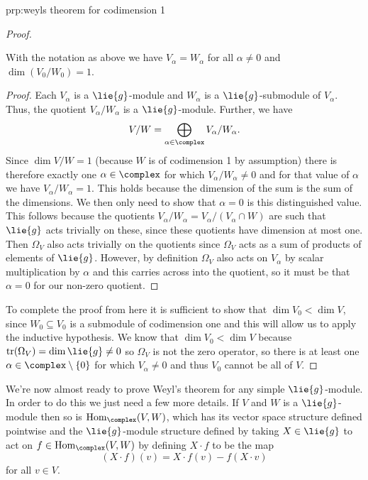 \documentclass[fleqn]{NotesClass}
\DeclareMathOperator{\Hom}{Hom}
\DeclareMathOperator{\tr}{tr}
\begin{document}
\begin{prp}{}{prp:weyls theorem for codimension 1}
\begin{proof}
            \begin{clm}{}{}
                With the notation as above we have \(V_\alpha = W_\alpha\) for all \(\alpha \ne 0\) and \(\dim (V_0/W_0) = 1\).
                \begin{proof}
                    Each \(V_\alpha\) is a \(\lie{g}\)-module and \(W_\alpha\) is a \(\lie{g}\)-submodule of \(V_\alpha\).
                    Thus, the quotient \(V_\alpha/W_\alpha\) is a \(\lie{g}\)-module.
                    Further, we have
                    \begin{equation}
                        V/W = \bigoplus_{\alpha \in \complex} V_\alpha/W_\alpha.
                    \end{equation}
                    Since \(\dim V/W = 1\) (because \(W\) is of codimension 1 by assumption) there is therefore exactly one \(\alpha \in \complex\) for which \(V_\alpha/W_\alpha \ne 0\) and for that value of \(\alpha\) we have \(V_\alpha/W_\alpha = 1\).
                    This holds because the dimension of the sum is the sum of the dimensions.
                    We then only need to show that \(\alpha = 0\) is this distinguished value.
                    This follows because the quotients \(V_\alpha/W_\alpha = V_\alpha/(V_\alpha \cap W)\) are such that \(\lie{g}\) acts trivially on these, since these quotients have dimension at most one.
                    Then \(\Omega_V\) also acts trivially on the quotients since \(\Omega_V\) acts as a sum of products of elements of \(\lie{g}\).
                    However, by definition \(\Omega_V\) also acts on \(V_\alpha\) by scalar multiplication by \(\alpha\) and this carries across into the quotient, so it must be that \(\alpha = 0\) for our non-zero quotient.
                \end{proof}
            \end{clm}
            
            To complete the proof from here it is sufficient to show that \(\dim V_0 < \dim V\), since \(W_0 \subseteq V_0\) is a submodule of codimension one and this will allow us to apply the inductive hypothesis.
            We know that \(\dim V_0 < \dim V\) because \(\tr(\Omega_V) = \dim \lie{g} \ne 0\) so \(\Omega_V\) is not the zero operator, so there is at least one \(\alpha \in \complex\setminus\{0\}\) for which \(V_\alpha \ne 0\) and thus \(V_0\) cannot be all of \(V\).
        \end{proof}
    \end{prp}
    
    We're now almost ready to prove Weyl's theorem for any simple \(\lie{g}\)-module.
    In order to do this we just need a few more details.
    If \(V\) and \(W\) is a \(\lie{g}\)-module then so is \(\Hom_{\complex}(V, W)\), which has its vector space structure defined pointwise and the \(\lie{g}\)-module structure defined by taking \(X \in \lie{g}\) to act on \(f \in \Hom_{\complex}(V, W)\) by defining \(X \cdot f\) to be the map
    \begin{equation}
        \label{eqn:natural action on homC}
        (X \cdot f)(v) = X \cdot f(v) - f(X \cdot v)
    \end{equation}
    for all \(v \in V\).
    
\end{document}
